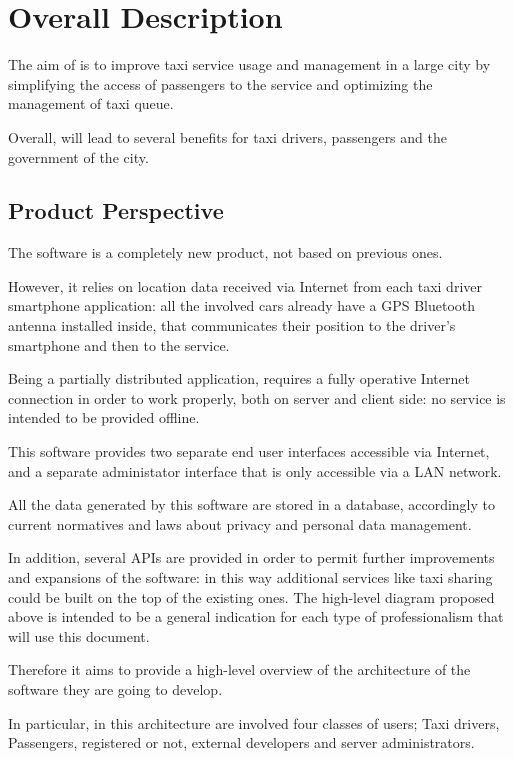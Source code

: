\section{Overall Description}
The aim of \myTaxiService{} is to improve taxi service usage and management in a large city by simplifying the access of passengers to the service and optimizing the management of taxi queue.\par
Overall, \myTaxiService{} will lead to several benefits for taxi drivers, passengers and the government of the city.
\subsection{Product Perspective}
The software \myTaxiService{} is a completely new product, not based on previous ones.\par
However, it relies on location data received via Internet from each taxi driver smartphone application: all the involved cars already have a GPS Bluetooth antenna installed inside, that communicates their position to the driver's smartphone and then to the service.\par
Being a partially distributed application, \myTaxiService{} requires a fully operative Internet connection in order to work properly, both on server and client side: no service is intended to be provided offline.\par
This software provides two separate end user interfaces accessible via Internet, and a separate administator interface that is only accessible via a LAN network.\par
All the data generated by this software are stored in a database, accordingly to current normatives and laws about privacy and personal data management.\par
In addition, several APIs are provided in order to permit further improvements and expansions of the software: in this way additional services like taxi sharing could be built on the top of the existing ones.
\showGeneralDiagram{}
The high-level diagram proposed above is intended to be a general indication for each type of professionalism that will use this document.\par
Therefore it aims to provide a high-level overview of the architecture of the software they are going to develop.\par
In particular, in this architecture are involved four classes of users; Taxi drivers, Passengers, registered or not, external developers and server administrators.\par
